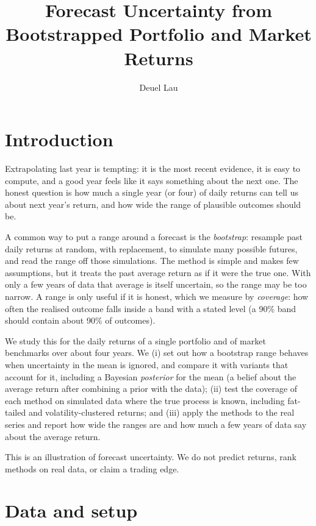 \documentclass{article}
\title{Forecast Uncertainty from Bootstrapped Portfolio and Market Returns}
\author{%
  Deuel Lau
}
\begin{document}
\maketitle

\begin{abstract}
\end{abstract}

\section{Introduction}\label{sec:intro}

Extrapolating last year is tempting: it is the most recent evidence, it is easy to compute, and a
good year feels like it says something about the next one. The honest question is how much a single
year (or four) of daily returns can tell us about next year's return, and how wide the range of
plausible outcomes should be.

A common way to put a range around a forecast is the \emph{bootstrap}: resample past daily returns
at random, with replacement, to simulate many possible futures, and read the range off those
simulations. The method is simple and makes few assumptions, but it treats the past average return
as if it were the true one. With only a few years of data that average is itself uncertain, so the
range may be too narrow. A range is only useful if it is honest, which we measure by
\emph{coverage}: how often the realised outcome falls inside a band with a stated level (a 90\% band
should contain about 90\% of outcomes).

We study this for the daily returns of a single portfolio and of market benchmarks over about four
years. We (i) set out how a bootstrap range behaves when uncertainty in the mean is ignored, and
compare it with variants that account for it, including a Bayesian \emph{posterior} for the mean (a
belief about the average return after combining a prior with the data); (ii) test the coverage of
each method on simulated data where the true process is known, including fat-tailed and
volatility-clustered returns; and (iii) apply the methods to the real series and report how wide the
ranges are and how much a few years of data say about the average return.

This is an illustration of forecast uncertainty. We do not predict returns, rank methods on real
data, or claim a trading edge.

\section{Data and setup}\label{sec:data}
\end{document}
